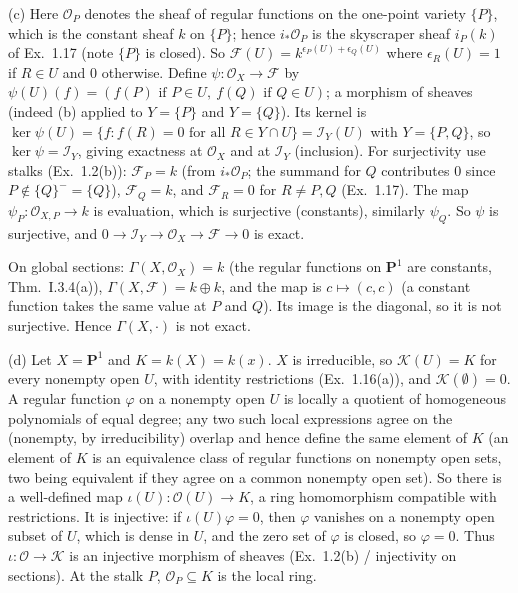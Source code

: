 \documentclass[11pt]{article}
\begin{document}
(c) Here $\mathcal O_P$ denotes the sheaf of regular functions on the one-point variety $\{P\}$, which is the constant sheaf $k$ on $\{P\}$; hence $i_*\mathcal O_P$ is the skyscraper sheaf $i_P(k)$ of Ex.~1.17 (note $\{P\}$ is closed). So $\mathcal F(U)=k^{\epsilon_P(U)+\epsilon_Q(U)}$ where $\epsilon_R(U)=1$ if $R\in U$ and $0$ otherwise. Define $\psi\colon\mathcal O_X\to\mathcal F$ by $\psi(U)(f)=(f(P)\text{ if }P\in U,\ f(Q)\text{ if }Q\in U)$; a morphism of sheaves (indeed (b) applied to $Y=\{P\}$ and $Y=\{Q\}$). Its kernel is $\ker\psi(U)=\{f:f(R)=0\text{ for all }R\in Y\cap U\}=\mathcal I_Y(U)$ with $Y=\{P,Q\}$, so $\ker\psi=\mathcal I_Y$, giving exactness at $\mathcal O_X$ and at $\mathcal I_Y$ (inclusion). For surjectivity use stalks (Ex.~1.2(b)): $\mathcal F_P=k$ (from $i_*\mathcal O_P$; the summand for $Q$ contributes $0$ since $P\notin\{Q\}^-=\{Q\}$), $\mathcal F_Q=k$, and $\mathcal F_R=0$ for $R\ne P,Q$ (Ex.~1.17). The map $\psi_P\colon\mathcal O_{X,P}\to k$ is evaluation, which is surjective (constants), similarly $\psi_Q$. So $\psi$ is surjective, and $0\to\mathcal I_Y\to\mathcal O_X\to\mathcal F\to0$ is exact.

On global sections: $\Gamma(X,\mathcal O_X)=k$ (the regular functions on $\mathbf P^1$ are constants, Thm.~I.3.4(a)), $\Gamma(X,\mathcal F)=k\oplus k$, and the map is $c\mapsto(c,c)$ (a constant function takes the same value at $P$ and $Q$). Its image is the diagonal, so it is not surjective. Hence $\Gamma(X,\cdot)$ is not exact.

(d) Let $X=\mathbf P^1$ and $K=k(X)=k(x)$. $X$ is irreducible, so $\mathcal K(U)=K$ for every nonempty open $U$, with identity restrictions (Ex.~1.16(a)), and $\mathcal K(\emptyset)=0$. A regular function $\varphi$ on a nonempty open $U$ is locally a quotient of homogeneous polynomials of equal degree; any two such local expressions agree on the (nonempty, by irreducibility) overlap and hence define the same element of $K$ (an element of $K$ is an equivalence class of regular functions on nonempty open sets, two being equivalent if they agree on a common nonempty open set). So there is a well-defined map $\iota(U)\colon\mathcal O(U)\to K$, a ring homomorphism compatible with restrictions. It is injective: if $\iota(U)\varphi=0$, then $\varphi$ vanishes on a nonempty open subset of $U$, which is dense in $U$, and the zero set of $\varphi$ is closed, so $\varphi=0$. Thus $\iota\colon\mathcal O\to\mathcal K$ is an injective morphism of sheaves (Ex.~1.2(b) / injectivity on sections). At the stalk $P$, $\mathcal O_P\subseteq K$ is the local ring.
\end{document}
